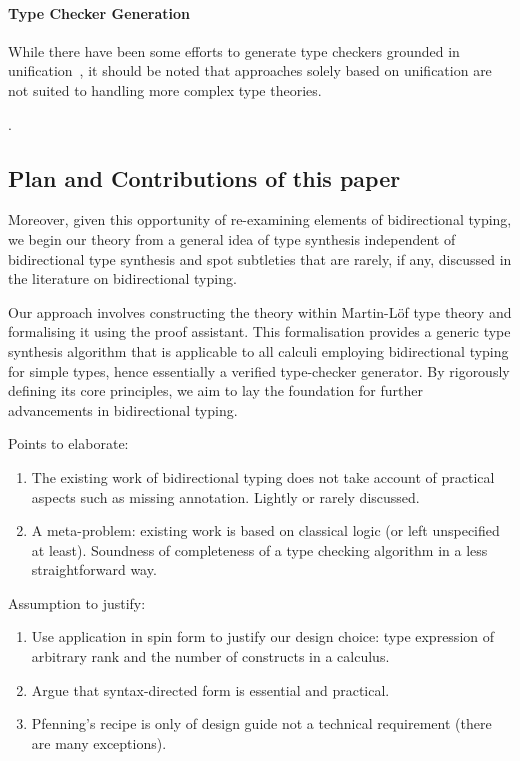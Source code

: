 \paragraph{Type Checker Generation}
While there have been some efforts to generate type checkers grounded in unification~\citep{Gast2004,Grewe2015}, it should be noted that approaches solely based on unification are not suited to handling more complex type theories.

\cite{Pacak2020,Cimini2020}. 

\subsection{Plan and Contributions of this paper}

Moreover, given this opportunity of re-examining elements of bidirectional typing, we begin our theory from a general idea of type synthesis independent of bidirectional type synthesis and spot subtleties that are rarely, if any, discussed in the literature on bidirectional typing. 

Our approach involves constructing the theory within Martin-L\"of type theory and formalising it using the \Agda proof assistant.
This formalisation provides a generic type synthesis algorithm that is applicable to all calculi employing bidirectional typing for simple types, hence essentially a verified type-checker generator.
By rigorously defining its core principles, we aim to lay the foundation for further advancements in bidirectional typing.



Points to elaborate:
\begin{enumerate}
  \item The existing work of bidirectional typing does not take account of practical aspects such as missing annotation.
    Lightly or rarely discussed.
  \item A meta-problem: existing work is based on classical logic (or left unspecified at least).
    Soundness of completeness of a type checking algorithm in a less straightforward way.
\end{enumerate}
Assumption to justify:
\begin{enumerate}
  \item Use application in spin form to justify our design choice: type expression of arbitrary rank and the number of constructs in a calculus.
  \item Argue that syntax-directed form is essential and practical.
  \item Pfenning's recipe is only of design guide not a technical requirement (there are many exceptions).
\end{enumerate}

